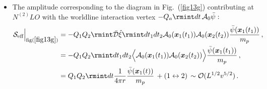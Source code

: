 \begin{itemize}
\begin{align}
\begin{split}
    \end{split}
\end{align}
\item The amplitude corresponding to the diagram in Fig.~(\ref{fig13g})   contributing at $N^{(2)}LO$ with the worldline interaction vertex $-Q_a\rmint dt\,\mathcal{A}_0\Bar{\psi} :$
\begin{align}
    \begin{split}
         \mathcal{S}_{\text{eff}}\Big|_{\text{fig}(\ref{fig13g})}&=-Q_1Q_2\rmint \Bar{\mathcal{D}}\hat{\xi}\rmint dt_1dt_2\mathcal{A}_0(\boldsymbol{x}_1(t_1))\mathcal{A}_0(\boldsymbol{x}_2(t_2))\frac{\Bar{\psi}(\boldsymbol{x}_1(t_1))}{m_p}\,,\\&
          =-Q_1Q_2\rmint dt_1 dt_2\Big{
       \langle}\mathcal{A}_0(\boldsymbol{x}_1(t_1))\mathcal{A}_0(\boldsymbol{x}_2(t_2))\Big{\rangle}\frac{\Bar{\psi}(\boldsymbol{x}_1(t_1))}{m_p} \,,\\&
       =Q_1Q_2\rmint dt\frac{1}{4\pi r}\frac{\Bar{\psi}(\boldsymbol{x}_1(t))}{m_p}\,+(1\leftrightarrow 2)\,\sim\mathcal{O}(L^{1/2}v^{5/2})\,.
    \end{split}
\end{align}

\end{itemize}
